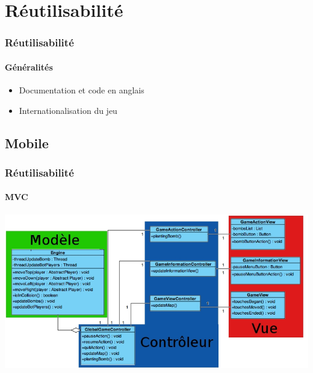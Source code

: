 \section{Réutilisabilité}

	\begin{frame}
	\frametitle{Réutilisabilité}
	\framesubtitle{Généralités}
	
		\begin{itemize}
			\item Documentation et code en anglais
			\item Internationalisation du jeu
		\end{itemize}
	
	\end{frame}

\subsection{Mobile}

	\begin{frame}
	\frametitle{Réutilisabilité}
	\framesubtitle{MVC}
	
	\begin{center}
		\includegraphics[scale=0.3]{img/mvc.jpg}
	\end{center}

	\end{frame}

